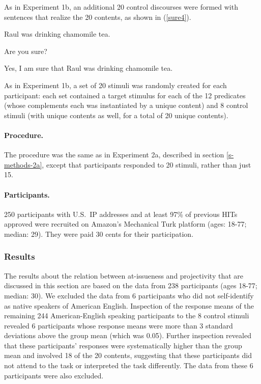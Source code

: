 \documentclass[11pt,fleqn]{article}
\newcommand{\6}{\mbox{$[\hspace*{-.6mm}[$}}
\newcommand{\9}{\mbox{$]\hspace*{-.6mm}]$}}
\begin{document}
As in Experiment 1b, an additional 20 control discourses were formed with sentences that realize the 20 contents, as shown in (\ref{sure4}).

\begin{exe}
\ex\label{sure4}
\begin{xlist}
 Raul was drinking chamomile tea.

 Are you sure?

 Yes, I am sure that Raul was drinking chamomile tea.
\end{xlist}
\end{exe}
As in Experiment 1b, a set of 20 stimuli was randomly created for each participant: each set contained a target stimulus for each of the 12 predicates (whose complements each was instantiated by a unique content) and 8 control stimuli (with unique contents as well, for a total of 20 unique contents). 

\paragraph{Procedure.} The procedure was the same as in Experiment 2a, described in section \ref{s-methods-2a}, except that participants responded to 20 stimuli, rather than just 15.

\paragraph{Participants.} 250 participants with U.S.\ IP addresses and at least 97\% of previous HITs approved were recruited on Amazon's Mechanical Turk platform (ages: 18-77; median: 29). They were paid 30 cents for their participation.

\subsubsection{Results}

The results about the relation between at-issueness and projectivity that are discussed in this section are based on the data from 238 participants (ages 18-77; median: 30). We excluded the data from 6 participants who did not self-identify as native speakers of American English. Inspection of the response means of the remaining 244 American-English speaking participants to the 8 control stimuli revealed 6 participants whose response means were more than 3 standard deviations above the group mean (which was 0.05). Further inspection revealed that these participants' responses were systematically higher than the group mean and involved 18 of the 20 contents, suggesting that these participants did not attend to the task or interpreted the task differently. The data from these 6 participants were also excluded.
\end{document}
